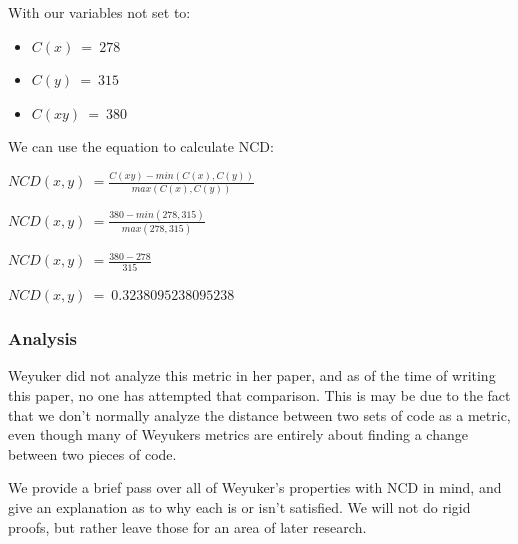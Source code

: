 \documentclass[]{article}
\begin{document}
With our variables not set to:

\begin{itemize}
	\item $C(x) ~= ~278$
	\item $C(y) ~= ~315$
	\item $C(xy) ~= ~380$
\end{itemize}

We can use the equation to calculate NCD:

$NCD(x,y) ~= \frac{C(xy) - min(C(x),C(y))}{max(C(x),C(y))}$

$NCD(x,y) ~= \frac{380 - min(278,315)}{max(278,315)}$

$NCD(x,y) ~= \frac{380 - 278}{315}$

$NCD(x,y) ~= ~0.3238095238095238$

\subsubsection{Analysis}

Weyuker did not analyze this metric in her paper, and as of the time of writing this paper, no one has attempted that comparison.
This is may be due to the fact that we don't normally analyze the distance between two sets of code as a metric, even though many of Weyukers metrics are entirely about finding a change between two pieces of code.

We provide a brief pass over all of Weyuker's properties with NCD in mind, and give an explanation as to why each is or isn't satisfied. 
We will not do rigid proofs, but rather leave those for an area of later research.
\end{document}
